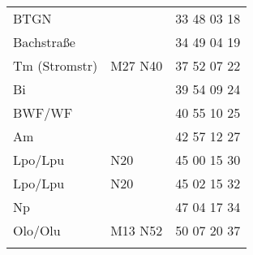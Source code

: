 \begin{tabular}{!{\color{schiefergrau}\vrule width 3pt}*{3}{l!{\color{schiefergrau}\vrule width 3pt}}}
BTGN         &                                                                       & 33 48 03 18 \\
Bachstraße   &                                                                       & 34 49 04 19 \\
Tm (Stromstr)& \mbus{} M27 \nbus{} N40                                               & 37 52 07 22 \\
Bi           &                                                                       & 39 54 09 24 \\
BWF/WF       &                                                                       & 40 55 10 25 \\
Am           &                                                                       & 42 57 12 27 \\
Lpo/Lpu      & \nusechs{} \nbus{} N20                                                & 45 00 15 30 \\
\hline
Lpo/Lpu      & \nusechs{} \nbus{} N20                                                & 45 02 15 32 \\
Np           &                                                                       & 47 04 17 34 \\
Olo/Olu      & \nuacht{} \mtram{} M13 \nbus{} N52                                    & 50 07 20 37 \\
\myhline
\end{tabular}
